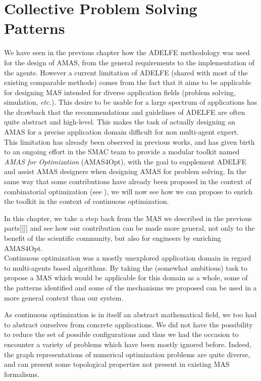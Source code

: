\chapter{Collective Problem Solving Patterns}\label{CPSP}

We have seen in the previous chapter how the ADELFE methodology was used for the design of AMAS, from the general requirements to the implementation of the agents. However a current limitation of ADELFE (shared with most of the existing comparable methods) comes from the fact that it aims to be applicable for designing MAS intended for diverse application fields (problem solving, simulation, \emph{etc.}). This desire to be usable for a large spectrum of applications has the drawback that the recommendations and guidelines of ADELFE are often quite abstract and high-level. This makes the task of actually designing an AMAS for a precise application domain difficult for non multi-agent expert.\\
This limitation has already been observed in previous works, and has given birth to an ongoing effort in the SMAC team to provide a modular toolkit named \emph{AMAS for Optimization} (AMAS4Opt), with the goal to supplement ADELFE and assist AMAS designers when designing AMAS for problem solving. In the same way that some contributions have already been proposed in the context of combinatorial optimization (see \cite{Ka2011.6}), we will now see how we can propose to enrich the toolkit in the context of continuous optimization.

In this chapter, we take a step back from the MAS we described in the previous parts[[]] and see how our contribution can be made more general, not only to the benefit of the scientific community, but also for engineers by enriching AMAS4Opt.\\
Continuous optimization was a mostly unexplored application domain in regard to multi-agents based algorithms. By taking the (somewhat ambitious) task to propose a MAS which would be applicable for this domain as a whole, some of the patterns identified and some of the mechanisms we proposed can be used in a more general context than our system.

As continuous optimization is in itself an abstract mathematical field, we too had to abstract ourselves from concrete applications. We did not have the possibility to reduce the set of possible configurations and thus we had the occasion to encounter a variety of problems which have been mostly ignored before. Indeed, the graph representations of numerical optimization problems are quite diverse, and can present some topological properties not present in existing MAS formalisms.

